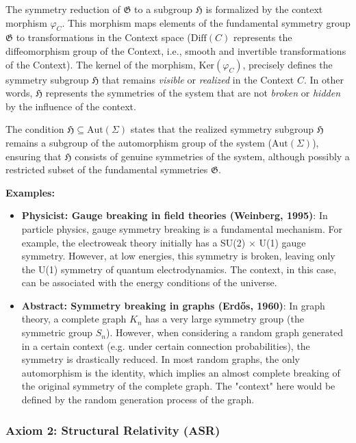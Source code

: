 \documentclass{article}
\begin{document}
The symmetry reduction of $\mathfrak{G}$ to a subgroup $\mathfrak{H}$ is formalized by the context morphism $\varphi_C$. This morphism maps elements of the fundamental symmetry group $\mathfrak{G}$ to transformations in the Context space ($\text{Diff}(C)$ represents the diffeomorphism group of the Context, i.e., smooth and invertible transformations of the Context). The kernel of the morphism, $\text{Ker}(\varphi_C)$, precisely defines the symmetry subgroup $\mathfrak{H}$ that remains \textit{visible} or \textit{realized} in the Context $C$. In other words, $\mathfrak{H}$ represents the symmetries of the system that are not \textit{broken} or \textit{hidden} by the influence of the context.

The condition $\mathfrak{H} \subseteq \text{Aut}(\Sigma)$ states that the realized symmetry subgroup $\mathfrak{H}$ remains a subgroup of the automorphism group of the system ($\text{Aut}(\Sigma)$), ensuring that $\mathfrak{H}$ consists of genuine symmetries of the system, although possibly a restricted subset of the fundamental symmetries $\mathfrak{G}$.

\textbf{Examples:}
\begin{itemize}
    \item \textbf{Physicist: Gauge breaking in field theories (Weinberg, 1995)}: In particle physics, gauge symmetry breaking is a fundamental mechanism. For example, the electroweak theory initially has a SU(2) $\times$ U(1) gauge symmetry. However, at low energies, this symmetry is broken, leaving only the U(1) symmetry of quantum electrodynamics. The context, in this case, can be associated with the energy conditions of the universe.

    \item \textbf{Abstract: Symmetry breaking in graphs (Erdős, 1960)}: In graph theory, a complete graph $K_n$ has a very large symmetry group (the symmetric group $S_n$). However, when considering a random graph generated in a certain context (e.g. under certain connection probabilities), the symmetry is drastically reduced. In most random graphs, the only automorphism is the identity, which implies an almost complete breaking of the original symmetry of the complete graph. The "context" here would be defined by the random generation process of the graph.
\end{itemize}

\subsubsection{Axiom 2: Structural Relativity (ASR)}
\end{document}
